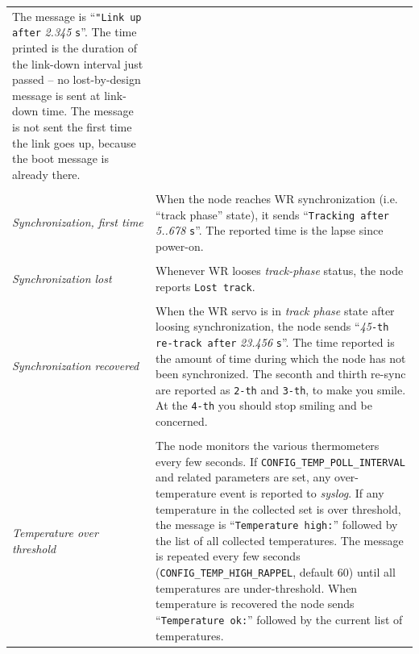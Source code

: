 \documentclass[a4paper, 12pt]{article}
\begin{document}
\begin{sloppypar}
\begin{longtable}{  p{6.5cm}  p{9cm} }
	The message is ``\texttt{"Link up after} \textit{2.345} \texttt{s}''. The
        time printed is the duration of the link-down interval just
        passed -- no lost-by-design message is sent at link-down time. The
        message is not sent the first time the link goes up, because
        the boot message is already there.\\
& \\
\textit{ Synchronization, first time } &

	When the node reaches WR synchronization (i.e. ``track phase''
        state), it sends ``\texttt{Tracking after} \textit{5..678} \texttt{s}''.
        The reported time is the lapse since power-on.\\
& \\
\textit{ Synchronization lost } &

	Whenever WR looses \textit{track-phase} status, the node reports
        \texttt{Lost track}.\\
& \\
\textit{ Synchronization recovered } &

	When the WR servo is in \textit{track phase} state after loosing
        synchronization, the node sends ``\textit{45}\texttt{-th re-track after}
        \textit{23.456} \texttt{s}''. The time reported is the amount of time
        during which the node has not been synchronized. The seconth and
        thirth re-sync are reported as \texttt{2-th} and \texttt{3-th}, to make you
        smile. At the \texttt{4-th} you should stop smiling and be concerned.\\
& \\
\textit{ Temperature over threshold } &

	The node monitors the various thermometers every few seconds.
        If \texttt{CONFIG\_TEMP\_POLL\_INTERVAL} and related parameters are
        set, any over-temperature event is reported to \textit{syslog}.
        If any temperature in the collected set is over threshold,
        the message is ``\texttt{Temperature high:}'' followed by the list of
        all collected temperatures.  The message is repeated every
        few seconds (\texttt{CONFIG\_TEMP\_HIGH\_RAPPEL}, default 60)
        until all temperatures are under-threshold. When temperature
        is recovered the node sends ``\texttt{Temperature ok:}'' followed by
        the current list of temperatures.\\

\end{longtable}
\end{sloppypar}
\end{document}
